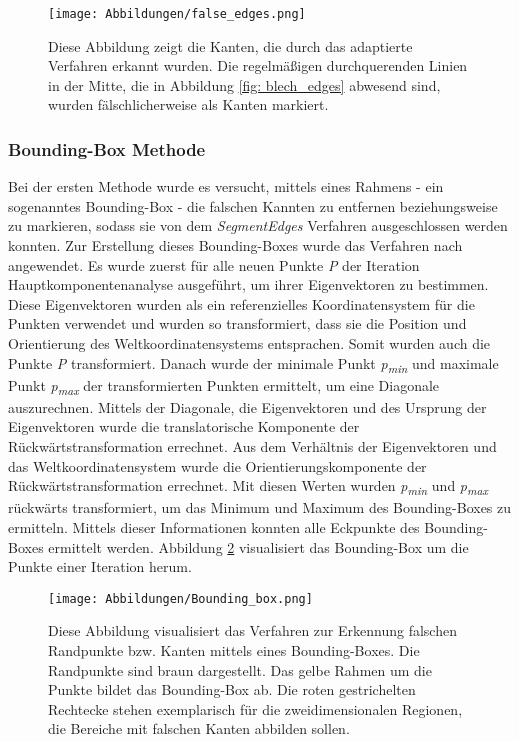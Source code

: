 \begin{figure}[h]
	\texttt{[image: Abbildungen/false\_edges.png]}
	\centering
	\caption{Diese Abbildung zeigt die Kanten, die durch das adaptierte Verfahren erkannt wurden. Die regelmäßigen durchquerenden Linien in der Mitte, die in Abbildung \ref{fig: blech_edges} abwesend sind, wurden fälschlicherweise als Kanten markiert. }
	\label{fig: false_edges}
\end{figure}

\subsubsection{Bounding-Box Methode}
Bei der ersten Methode wurde es versucht, mittels eines Rahmens - ein sogenanntes Bounding-Box - die falschen Kannten zu entfernen beziehungsweise zu markieren, sodass sie von dem \textit{SegmentEdges} Verfahren ausgeschlossen werden konnten. Zur Erstellung dieses Bounding-Boxes wurde das Verfahren nach \textcite{noauthor_find_2015} angewendet. Es wurde zuerst für alle neuen Punkte \textit{P} der Iteration Hauptkomponentenanalyse ausgeführt, um ihrer Eigenvektoren zu bestimmen. Diese Eigenvektoren wurden als ein referenzielles Koordinatensystem für die Punkten verwendet und wurden so transformiert, dass sie die Position und Orientierung des Weltkoordinatensystems entsprachen. Somit wurden auch die Punkte \textit{P} transformiert. Danach wurde der minimale Punkt \textit{p\textsubscript{min}} und maximale Punkt \textit{p\textsubscript{max}} der transformierten Punkten ermittelt, um eine Diagonale auszurechnen. Mittels der Diagonale, die Eigenvektoren und des Ursprung der Eigenvektoren wurde die translatorische Komponente der Rückwärtstransformation errechnet. Aus dem Verhältnis der Eigenvektoren und das Weltkoordinatensystem wurde die Orientierungskomponente der Rückwärtstransformation errechnet. Mit diesen Werten wurden \textit{p\textsubscript{min}} und \textit{p\textsubscript{max}} rückwärts transformiert, um das Minimum und Maximum des Bounding-Boxes zu ermitteln. Mittels dieser Informationen konnten alle Eckpunkte des Bounding-Boxes ermittelt werden. Abbildung \ref{fig: bounding_box} visualisiert das Bounding-Box um die Punkte einer Iteration herum.

\begin{figure}[h]
	\texttt{[image: Abbildungen/Bounding\_box.png]}
	\centering
	\caption{Diese Abbildung visualisiert das Verfahren zur Erkennung falschen Randpunkte bzw. Kanten mittels eines Bounding-Boxes. Die Randpunkte sind braun dargestellt. Das gelbe Rahmen um die Punkte bildet das Bounding-Box ab. Die roten gestrichelten Rechtecke stehen exemplarisch für die zweidimensionalen Regionen, die Bereiche mit falschen Kanten abbilden sollen.}
	\label{fig: bounding_box}
\end{figure}

